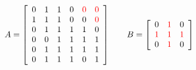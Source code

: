 \documentclass[varwidth=true]{standalone}
\newcommand{\tikzmark}[2]{\tikz[overlay,remember picture,baseline=(#1.base)] \node (#1) {#2};}
\begin{document}
\[
	A = \left[\begin{array}{*6{c}}
    0 & 1 & 1 & 0 & \color{red}{0} & \color{red}{0} \\
    1 & 1 & 1 & 0 & 0 & \color{red}{0} \\
    0 & 1 & 1 & 1 & 1 & 0 \\
    0 & 0 & 1 & 1 & 1 & 1 \\
    0 & 1 & 1 & 1 & 1 & 1  \\
    0 & 1 & 1 & 1 & 0 & 1 
  \end{array}\right]
  \qquad
  B  = \left[\begin{array}{*3{c}}
    \tikzmark{left}{0} & \color{red}{1} & 0\\
    \color{red}{1} & \color{red}{1} & \color{red}{1} \\
    0 & \color{red}{1} & \tikzmark{right}{0}
  \end{array}\right]
\]

\end{document}
